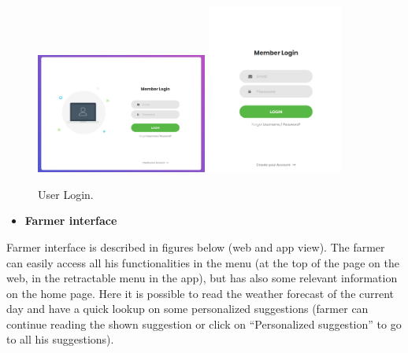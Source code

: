 \documentclass{article}
\begin{document}
    \begin{figure} [h]
        \centering
        \includegraphics[width=0.5\textwidth]{images/interfaces/UserLoginWeb.png}
        \quad
        \includegraphics[width=0.4\textwidth]{images/interfaces/UserLoginApp.png}
        \quad
        \caption{\label{fig:frog}User Login.}
    \end{figure}
    
    \newpage
    
    
    

    \begin{itemize}
        \item \textbf{Farmer interface}
    \end{itemize}
    
    Farmer interface is described in figures below (web and app view). The farmer can easily access all his functionalities in the menu (at the top of the page on the web, in the retractable menu in the app), but has also some relevant information on the home page. Here it is possible to read the weather forecast of the current day and have a quick lookup on some personalized suggestions (farmer can continue reading the shown suggestion or click on “Personalized suggestion” to go to all his suggestions).
    
\end{document}
